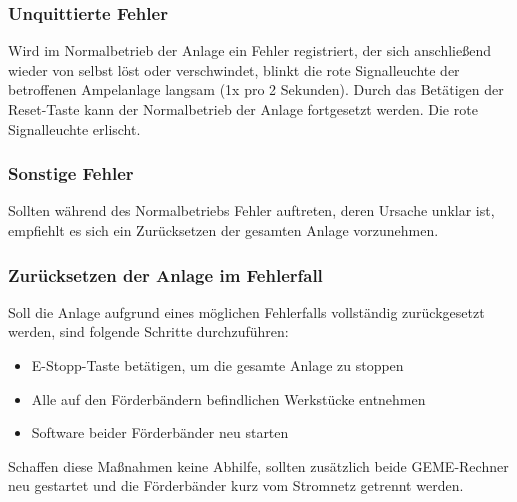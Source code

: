 \documentclass[oneside,a4paper,titlepage]{scrartcl} %
\begin{document}
\subsubsection{Unquittierte Fehler}
Wird im Normalbetrieb der Anlage ein Fehler registriert, der sich anschließend wieder von selbst löst oder verschwindet, blinkt die rote Signalleuchte der betroffenen Ampelanlage langsam (1x pro 2 Sekunden). Durch das Betätigen der Reset-Taste kann der Normalbetrieb der Anlage fortgesetzt werden. Die rote Signalleuchte erlischt.

\subsubsection{Sonstige Fehler}
Sollten während des Normalbetriebs Fehler auftreten, deren Ursache unklar ist, empfiehlt es sich ein Zurücksetzen der gesamten Anlage vorzunehmen. 

\subsubsection{Zurücksetzen der Anlage im Fehlerfall}
Soll die Anlage aufgrund eines möglichen Fehlerfalls vollständig zurückgesetzt werden, sind folgende Schritte durchzuführen:
\begin{itemize}
  \item E-Stopp-Taste betätigen, um die gesamte Anlage zu stoppen
  \item Alle auf den Förderbändern befindlichen Werkstücke entnehmen
  \item Software beider Förderbänder neu starten  
\end{itemize}
Schaffen diese Maßnahmen keine Abhilfe, sollten zusätzlich beide GEME-Rechner neu gestartet und die Förderbänder kurz vom Stromnetz getrennt werden.
\end{document}
